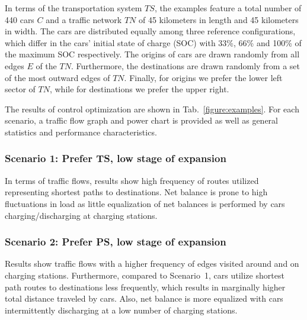 
In terms of the transportation system $TS$, the examples feature a total number of 440 cars $C$ and a traffic network $TN$ of 45 kilometers in length and 45 kilometers in width. The cars are distributed equally among three reference configurations, which differ in the cars' initial state of charge (SOC) with 33\%, 66\% and 100\% of the maximum SOC respectively. The origins of cars are drawn randomly from all edges $E$ of the $TN$. Furthermore, the destinations are drawn randomly from a set of the most outward edges of $TN$. Finally, for origins we prefer the lower left sector of $TN$, while for destinations we prefer the upper right.

The results of control optimization are shown in Tab.~\ref{figure:examples}. For each scenario, a traffic flow graph and power chart is provided as well as general statistics and performance characteristics.

\subsubsection*{Scenario 1: Prefer TS, low stage of expansion} 

In terms of traffic flows, results show high frequency of routes utilized representing shortest paths to destinations. Net balance is prone to high fluctuations in load as little equalization of net balances is performed by cars charging/discharging at charging stations.


\subsubsection*{Scenario 2: Prefer PS, low stage of expansion}

Results show traffic flows with a higher frequency of edges visited around and on charging stations. Furthermore, compared to Scenario~1, cars utilize shortest path routes to destinations less frequently, which results in marginally higher total distance traveled by cars. Also, net balance is more equalized with cars intermittently discharging at a low number of charging stations.

